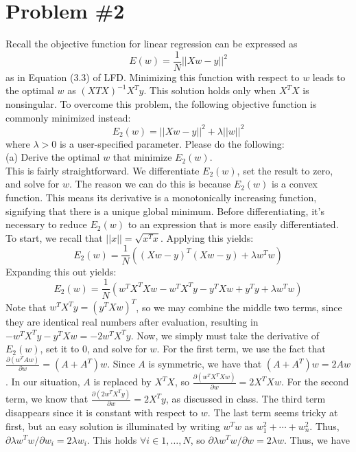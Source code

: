 \documentclass[12pt]{article}
\begin{document}
	\section*{Problem \#2}
	Recall the objective function for linear regression can be expressed as 
	\begin{equation*}
	E(w) = \frac{1}{N} ||Xw-y||^2
	\end{equation*}
	as in Equation (3.3) of LFD. Minimizing this function with respect to $w$ leads to the optimal
	$w$ as $(X T X)^{-1} X^T y$. This solution holds only when $X^TX$ is nonsingular. To overcome this problem, the following objective function is commonly minimized instead:
	\begin{equation*}
	E_2(w) = ||Xw-y||^2 + \lambda ||w||^2
	\end{equation*}
	where $\lambda > 0$ is a user-specified parameter. Please do the following: \\
	(a) Derive the optimal $w$ that minimize $E_2(w)$.\\
	This is fairly straightforward. We differentiate $E_2(w)$, set the result to zero, and solve for $w$. The reason we can do this is because $E_2(w)$ is a convex function. This means its derivative is a monotonically increasing function, signifying that there is a unique global minimum. 
	Before differentiating, it's necessary to reduce $E_2(w)$ to an expression that is more easily differentiated. To start, we recall that $||x||=\sqrt{x^T x}$. Applying this yields:
	\begin{equation*}
	E_2(w) = \frac{1}{N}((Xw-y)^T(Xw-y)+\lambda w^T w)
	\end{equation*}
	Expanding this out yields:
	\begin{equation*}
	E_2(w) = \frac{1}{N} (w^T X^T X w-w^T X^T y-y^T Xw+y^T y + \lambda w^T w)
	\end{equation*}
	Note that $w^T X^T y=(y^T Xw)^T$, so we may combine the middle two terms, since they are identical real numbers after evaluation, resulting in $-w^T X^T y -y^T Xw=-2w^T X^T y$. Now, we simply must take the derivative of $E_2(w)$, set it to $0$, and solve for $w$. For the first term, we use the fact that $\frac{\partial(w^T Aw)}{\partial w} = (A+A^T)w$. Since $A$ is symmetric, we have that $(A+A^T)w=2Aw$. In our situation, $A$ is replaced by $X^T X$, so $\frac{\partial(w^T X^T Xw)}{\partial w} = 2X^T Xw$. For the second term, we know that $\frac{\partial(2w^T X^T y)}{\partial w} = 2X^T y$, as discussed in class. The third term disappears since it is constant with respect to $w$. The last term seems tricky at first, but an easy solution is illuminated by writing $w^T w$ as $w_1^2+\cdots+w_n^2$. Thus, $\partial \lambda w^T w / \partial w_i = 2\lambda w_i$. This holds $\forall i \in {1,\dots, N}$, so $\partial \lambda w^T w / \partial w = 2\lambda w$. Thus, we have
\end{document}
